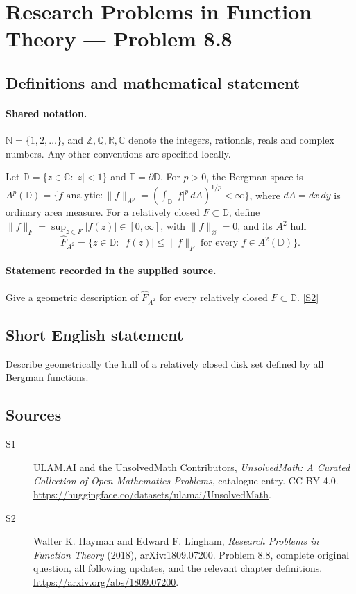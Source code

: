 \documentclass[11pt]{book}
\newcommand{\sref}[2]{\hyperlink{source:#1:#2}{[S#2]}}
\begin{document}
\section{Research Problems in Function Theory — Problem 8.8}\label{statement}

\subsection{Definitions and mathematical statement}

\paragraph{Shared notation.}$\mathbb N=\{1,2,\ldots\}$, and $\mathbb Z,\mathbb Q,\mathbb R,\mathbb C$ denote the integers, rationals, reals and complex numbers. Any other conventions are specified locally.


Let $\mathbb D=\{z\in\mathbb C:|z|<1\}$ and $\mathbb T=\partial\mathbb D$. For $p>0$, the Bergman space is $A^p(\mathbb D)=\{f\text{ analytic}:\|f\|_{A^p}=(\int_{\mathbb D}|f|^p\,dA)^{1/p}<\infty\}$, where $dA=dx\,dy$ is ordinary area measure. For a relatively closed $F\subset\mathbb D$, define $\|f\|_F=\sup_{z\in F}|f(z)|\in[0,\infty]$, with $\|f\|_\varnothing=0$, and its $A^2$ hull \[\widehat F_{A^2}=\{z\in\mathbb D:\ |f(z)|\le\|f\|_F\text{ for every }f\in A^2(\mathbb D)\}.\]
\paragraph{Statement recorded in the supplied source.}
Give a geometric description of $\widehat F_{A^2}$ for every relatively closed $F\subset\mathbb D$. \sref{statement}{2}
\subsection{Short English statement}
Describe geometrically the hull of a relatively closed disk set defined by all Bergman functions.
\subsection{Sources}
\begin{description}
\item[\hypertarget{source:statement:1}{S1}] ULAM.AI and the UnsolvedMath Contributors, \emph{UnsolvedMath: A Curated Collection of Open Mathematics Problems}, catalogue entry. CC BY 4.0. \url{https://huggingface.co/datasets/ulamai/UnsolvedMath}.
\item[\hypertarget{source:statement:2}{S2}] Walter K. Hayman and Edward F. Lingham, \emph{Research Problems in Function Theory} (2018), arXiv:1809.07200. Problem 8.8, complete original question, all following updates, and the relevant chapter definitions. \url{https://arxiv.org/abs/1809.07200}.
\end{description}
\label{end:statement}
\end{document}
